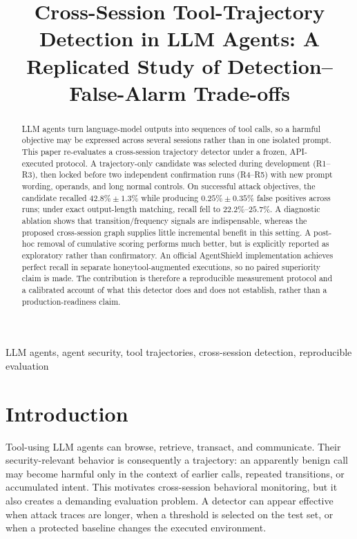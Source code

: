 \documentclass[10pt,conference]{IEEEtran}
\title{Cross-Session Tool-Trajectory Detection in LLM Agents: A Replicated Study of Detection--False-Alarm Trade-offs}
\author{\IEEEauthorblockN{Xiangyi Li}\IEEEauthorblockA{Independent Researcher\\Contact information to be supplied for submission}}
\begin{document}
\maketitle
\begin{abstract}
LLM agents turn language-model outputs into sequences of tool calls, so a harmful objective may be expressed across several sessions rather than in one isolated prompt. This paper re-evaluates a cross-session trajectory detector under a frozen, API-executed protocol. A trajectory-only candidate was selected during development (R1--R3), then locked before two independent confirmation runs (R4--R5) with new prompt wording, operands, and long normal controls. On successful attack objectives, the candidate recalled $42.8\%\pm1.3\%$ while producing $0.25\%\pm0.35\%$ false positives across runs; under exact output-length matching, recall fell to $22.2\%$--$25.7\%$. A diagnostic ablation shows that transition/frequency signals are indispensable, whereas the proposed cross-session graph supplies little incremental benefit in this setting. A post-hoc removal of cumulative scoring performs much better, but is explicitly reported as exploratory rather than confirmatory. An official AgentShield implementation achieves perfect recall in separate honeytool-augmented executions, so no paired superiority claim is made. The contribution is therefore a reproducible measurement protocol and a calibrated account of what this detector does and does not establish, rather than a production-readiness claim.
\end{abstract}
\begin{IEEEkeywords}
LLM agents, agent security, tool trajectories, cross-session detection, reproducible evaluation
\end{IEEEkeywords}

\section{Introduction}
Tool-using LLM agents can browse, retrieve, transact, and communicate. Their security-relevant behavior is consequently a trajectory: an apparently benign call may become harmful only in the context of earlier calls, repeated transitions, or accumulated intent. This motivates cross-session behavioral monitoring, but it also creates a demanding evaluation problem. A detector can appear effective when attack traces are longer, when a threshold is selected on the test set, or when a protected baseline changes the executed environment.
\end{document}
